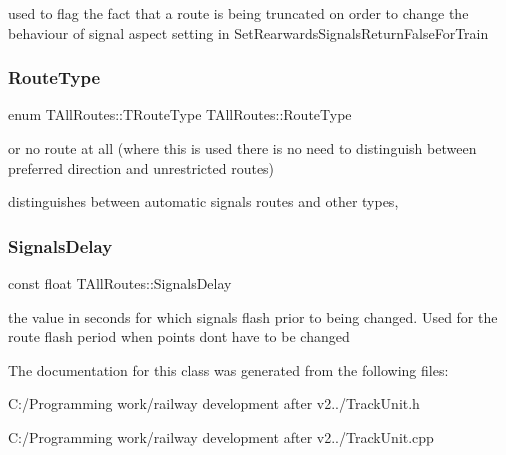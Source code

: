 used to flag the fact that a route is being truncated on order to change the behaviour of signal aspect setting in Set\+Rearwards\+Signals\+Return\+False\+For\+Train \mbox{\label{class_t_all_routes_a418f6235db60f6f41c56aede07b5fe24}} 
\subsubsection{\texorpdfstring{Route\+Type}{RouteType}}
{\footnotesize\ttfamily enum T\+All\+Routes\+::\+T\+Route\+Type  T\+All\+Routes\+::\+Route\+Type}



or no route at all (where this is used there is no need to distinguish between preferred direction and unrestricted routes) 

distinguishes between automatic signals routes and other types, \mbox{\label{class_t_all_routes_a7183b12f8de4fcb82e036252a37d574d}} 
\subsubsection{\texorpdfstring{Signals\+Delay}{SignalsDelay}}
{\footnotesize\ttfamily const float T\+All\+Routes\+::\+Signals\+Delay}

the value in seconds for which signals flash prior to being changed. Used for the route flash period when points don\textquotesingle{}t have to be changed 

The documentation for this class was generated from the following files\+:\begin{DoxyCompactItemize}
\item 
C\+:/\+Programming work/railway development after v2../Track\+Unit.\+h\item 
C\+:/\+Programming work/railway development after v2../Track\+Unit.\+cpp\end{DoxyCompactItemize}
